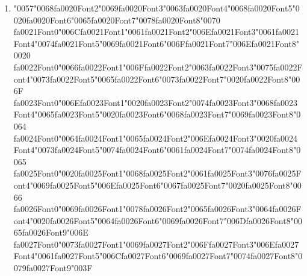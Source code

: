 \documentclass[12pt]{article}
\begin{document}
\begin{enumerate}[label=Q\arabic*.]
 \item {\char"0057}{\char"0068}{\csname fa0020Font2\endcsname\char"0069}{\csname fa0020Font3\endcsname\char"0063}{\csname fa0020Font4\endcsname\char"0068}{\csname fa0020Font5\endcsname\char"0020}{\csname fa0020Font6\endcsname\char"0065}{\csname fa0020Font7\endcsname\char"0078}{\csname fa0020Font8\endcsname\char"0070} {\csname fa0021Font0\endcsname\char"006C}{\csname fa0021Font1\endcsname\char"0061}{\csname fa0021Font2\endcsname\char"006E}{\csname fa0021Font3\endcsname\char"0061}{\csname fa0021Font4\endcsname\char"0074}{\csname fa0021Font5\endcsname\char"0069}{\csname fa0021Font6\endcsname\char"006F}{\csname fa0021Font7\endcsname\char"006E}{\csname fa0021Font8\endcsname\char"0020} {\csname fa0022Font0\endcsname\char"0066}{\csname fa0022Font1\endcsname\char"006F}{\csname fa0022Font2\endcsname\char"0063}{\csname fa0022Font3\endcsname\char"0075}{\csname fa0022Font4\endcsname\char"0073}{\csname fa0022Font5\endcsname\char"0065}{\csname fa0022Font6\endcsname\char"0073}{\csname fa0022Font7\endcsname\char"0020}{\csname fa0022Font8\endcsname\char"006F} {\csname fa0023Font0\endcsname\char"006E}{\csname fa0023Font1\endcsname\char"0020}{\csname fa0023Font2\endcsname\char"0074}{\csname fa0023Font3\endcsname\char"0068}{\csname fa0023Font4\endcsname\char"0065}{\csname fa0023Font5\endcsname\char"0020}{\csname fa0023Font6\endcsname\char"0068}{\csname fa0023Font7\endcsname\char"0069}{\csname fa0023Font8\endcsname\char"0064} {\csname fa0024Font0\endcsname\char"0064}{\csname fa0024Font1\endcsname\char"0065}{\csname fa0024Font2\endcsname\char"006E}{\csname fa0024Font3\endcsname\char"0020}{\csname fa0024Font4\endcsname\char"0073}{\csname fa0024Font5\endcsname\char"0074}{\csname fa0024Font6\endcsname\char"0061}{\csname fa0024Font7\endcsname\char"0074}{\csname fa0024Font8\endcsname\char"0065} {\csname fa0025Font0\endcsname\char"0020}{\csname fa0025Font1\endcsname\char"0068}{\csname fa0025Font2\endcsname\char"0061}{\csname fa0025Font3\endcsname\char"0076}{\csname fa0025Font4\endcsname\char"0069}{\csname fa0025Font5\endcsname\char"006E}{\csname fa0025Font6\endcsname\char"0067}{\csname fa0025Font7\endcsname\char"0020}{\csname fa0025Font8\endcsname\char"0066} {\csname fa0026Font0\endcsname\char"0069}{\csname fa0026Font1\endcsname\char"0078}{\csname fa0026Font2\endcsname\char"0065}{\csname fa0026Font3\endcsname\char"0064}{\csname fa0026Font4\endcsname\char"0020}{\csname fa0026Font5\endcsname\char"0064}{\csname fa0026Font6\endcsname\char"0069}{\csname fa0026Font7\endcsname\char"006D}{\csname fa0026Font8\endcsname\char"0065}{\csname fa0026Font9\endcsname\char"006E} {\csname fa0027Font0\endcsname\char"0073}{\csname fa0027Font1\endcsname\char"0069}{\csname fa0027Font2\endcsname\char"006F}{\csname fa0027Font3\endcsname\char"006E}{\csname fa0027Font4\endcsname\char"0061}{\csname fa0027Font5\endcsname\char"006C}{\csname fa0027Font6\endcsname\char"0069}{\csname fa0027Font7\endcsname\char"0074}{\csname fa0027Font8\endcsname\char"0079}{\csname fa0027Font9\endcsname\char"003F}

\end{enumerate}
\end{document}
